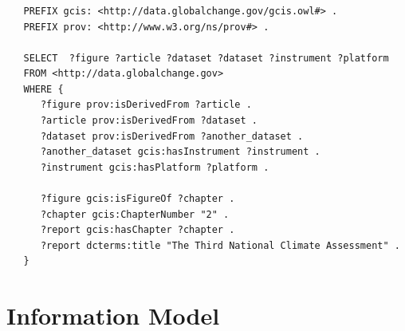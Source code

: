 \documentclass{beamer}
\begin{document}


\begin{frame}[fragile]
    \frametitle{\insertsubsectionhead}
\begin{small}
\begin{Verbatim}
   PREFIX gcis: <http://data.globalchange.gov/gcis.owl#> .
   PREFIX prov: <http://www.w3.org/ns/prov#> .

   SELECT  ?figure ?article ?dataset ?dataset ?instrument ?platform
   FROM <http://data.globalchange.gov>
   WHERE {
      ?figure prov:isDerivedFrom ?article .
      ?article prov:isDerivedFrom ?dataset .
      ?dataset prov:isDerivedFrom ?another_dataset .
      ?another_dataset gcis:hasInstrument ?instrument .
      ?instrument gcis:hasPlatform ?platform .

      ?figure gcis:isFigureOf ?chapter .
      ?chapter gcis:ChapterNumber "2" .
      ?report gcis:hasChapter ?chapter .
      ?report dcterms:title "The Third National Climate Assessment" .
   }
\end{Verbatim}
\end{small}
\end{frame}


\section{Information Model}
\end{document}
